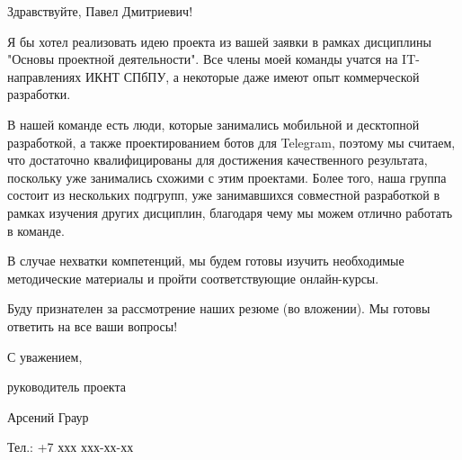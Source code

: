 \documentclass[a4paper,11pt]{article}
\begin{document}
	Здравствуйте, Павел Дмитриевич!
	
	\vspace{2mm}
	 
	Я бы хотел реализовать идею проекта из вашей заявки в рамках дисциплины "Основы проектной деятельности". Все члены моей команды учатся на IT-направлениях ИКНТ СПбПУ, а некоторые даже имеют опыт коммерческой разработки.

	В нашей команде есть люди, которые занимались мобильной и десктопной разработкой, а также проектированием ботов для Telegram, поэтому мы считаем, что достаточно квалифицированы для достижения качественного результата, поскольку уже занимались схожими с этим проектами. Более того, наша группа состоит из нескольких подгрупп, уже занимавшихся совместной разработкой в рамках изучения других дисциплин, благодаря чему мы можем отлично работать в команде.

	В случае нехватки компетенций, мы будем готовы изучить необходимые методические материалы и пройти соответствующие онлайн-курсы.

	Буду признателен за рассмотрение наших резюме (во вложении). Мы готовы ответить на все ваши вопросы!
	
	\vspace{2mm}
	
	С уважением,
	
	руководитель проекта
	
	Арсений Граур

	Тел.: +7 ххх ххх-хх-хх
\end{document}
